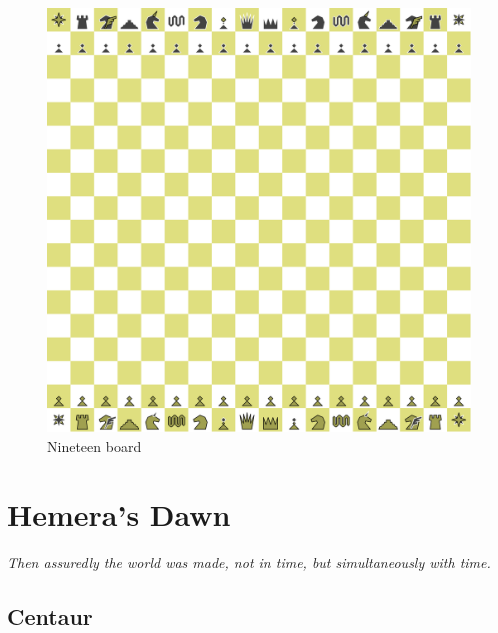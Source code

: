 \documentclass[a5paper,12pt,draft]{book} %
\begin{document}
\noindent
\begin{figure}[h]
\includegraphics[width=1.0\textwidth, keepaspectratio=true]{../gfx/boards/12_nineteen.png}
\caption{Nineteen board}
\label{fig:nineteen}
\end{figure}

\clearpage

\chapter*{Hemera's Dawn}

\begin{flushright}
\parbox{0.8\textwidth}{
\emph{Then assuredly the world was made, not in time, but simultaneously with time. \\
 } }
\end{flushright}

\section*{Centaur}
\end{document}
